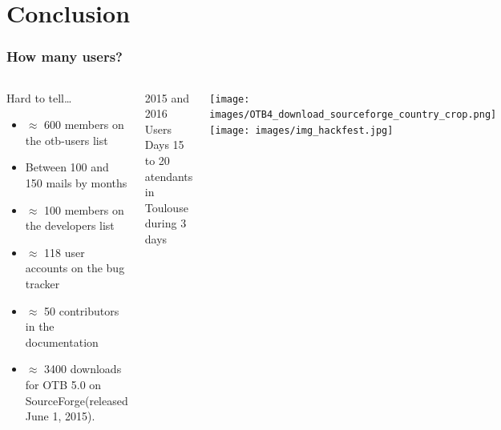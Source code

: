 \documentclass[8pt]{beamer}
\begin{document}
\section{Conclusion}
\begin{frame}
\frametitle{How many users?}
\begin{columns}[c]
\begin{block}{Hard to tell\ldots}
\begin{itemize}
    \item $\approx$ 600 members on the otb-users list
    \item Between 100 and 150 mails by months
    \item $\approx$ 100 members on the developers list
    \item $\approx$ 118 user accounts on the bug tracker
    \item $\approx$ 50 contributors in the documentation
    \item $\approx$ 3400 downloads for OTB 5.0 on SourceForge(released June 1, 2015).
  \end{itemize}
\end{block}
\begin{block}{2015 and 2016 Users Days}
  15 to 20 atendants in Toulouse during 3 days
\end{block}
\texttt{[image: images/OTB4\_download\_sourceforge\_country\_crop.png]}\\
\texttt{[image: images/img\_hackfest.jpg]}
\end{columns}
\end{frame}
\end{document}
